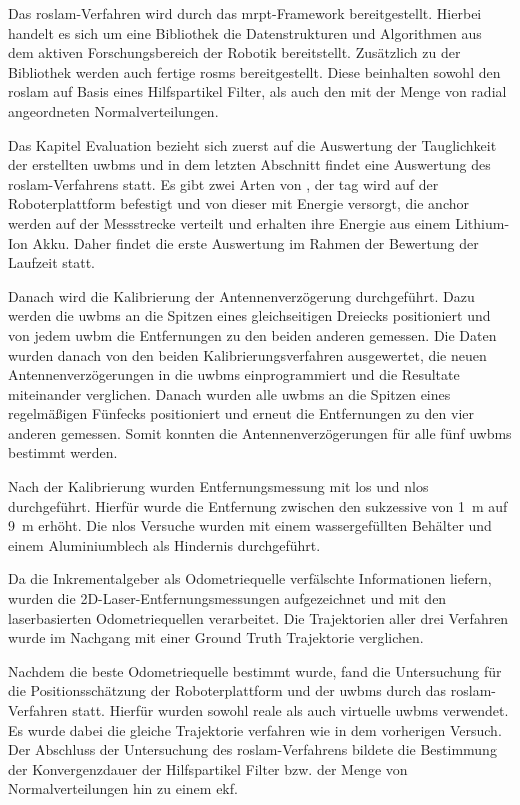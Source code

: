 Das \gls{roslam}-Verfahren wird durch das \gls{mrpt}-Framework bereitgestellt. Hierbei handelt es sich um eine Bibliothek die Datenstrukturen und Algorithmen aus dem aktiven Forschungsbereich der Robotik bereitstellt. Zusätzlich zu der Bibliothek werden auch fertige \glspl{rosm} bereitgestellt. Diese beinhalten sowohl den  \gls{roslam} auf Basis eines Hilfspartikel Filter, als auch den mit der Menge von radial angeordneten Normalverteilungen.

Das Kapitel Evaluation bezieht sich zuerst auf die Auswertung der Tauglichkeit der erstellten \glspl{uwbm} und in dem letzten Abschnitt findet eine Auswertung des \gls{roslam}-Verfahrens statt. Es gibt zwei Arten von , der \gls{tag} wird auf der Roboterplattform befestigt und von dieser mit Energie versorgt, die \gls{anchor} werden auf der Messstrecke verteilt und erhalten ihre Energie aus einem Lithium-Ion Akku. Daher findet die erste Auswertung im Rahmen der Bewertung der Laufzeit statt.

Danach wird die Kalibrierung der Antennenverzögerung durchgeführt. Dazu werden die \glspl{uwbm} an die Spitzen eines gleichseitigen Dreiecks positioniert und von jedem \gls{uwbm} die Entfernungen zu den beiden anderen  gemessen. Die Daten wurden danach von den beiden Kalibrierungsverfahren ausgewertet, die neuen Antennenverzögerungen in die \glspl{uwbm} einprogrammiert und die Resultate miteinander verglichen. Danach wurden alle \glspl{uwbm} an die  Spitzen eines regelmäßigen Fünfecks positioniert und erneut die Entfernungen zu den vier anderen  gemessen. Somit konnten die Antennenverzögerungen für alle fünf \glspl{uwbm} bestimmt werden.

Nach der Kalibrierung wurden Entfernungsmessung mit \gls{los} und \gls{nlos} durchgeführt. Hierfür wurde die Entfernung zwischen den  sukzessive von \SI{1}{\meter} auf \SI{9}{\meter} erhöht. Die \gls{nlos} Versuche wurden mit einem wassergefüllten Behälter und einem Aluminiumblech als Hindernis durchgeführt.

Da die Inkrementalgeber als Odometriequelle verfälschte Informationen liefern, wurden die 2D-Laser-Entfernungsmessungen aufgezeichnet und mit den laserbasierten Odometriequellen verarbeitet. Die Trajektorien aller drei Verfahren wurde im Nachgang mit einer Ground Truth Trajektorie verglichen.

Nachdem die beste Odometriequelle bestimmt wurde, fand die Untersuchung für die Positionsschätzung der Roboterplattform und der \glspl{uwbm} durch das \gls{roslam}-Verfahren statt. Hierfür wurden sowohl reale als auch virtuelle \glspl{uwbm} verwendet. Es wurde dabei die gleiche Trajektorie verfahren wie in dem vorherigen Versuch. Der Abschluss der Untersuchung des \gls{roslam}-Verfahrens bildete die Bestimmung der Konvergenzdauer der Hilfspartikel Filter bzw. der Menge von Normalverteilungen hin zu einem \gls{ekf}.


